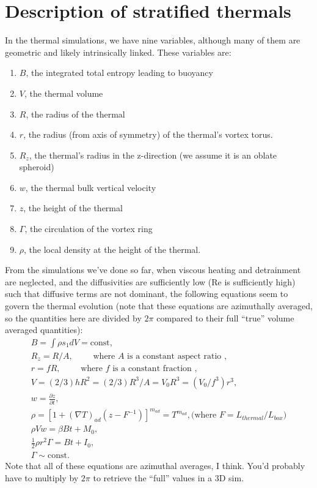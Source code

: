 \documentclass[onecolumn, amsmath, amsfonts, amssymb]{aastex62}
\newcommand{\grad}{\ensuremath{\nabla}}
\begin{document}
\section{Description of stratified thermals}
In the thermal simulations, we have nine variables, although many of them are geometric and
likely intrinsically linked. These variables are:
\begin{enumerate}
\item $B$, the integrated total entropy leading to buoyancy
\item $V$, the thermal volume
\item $R$, the radius of the thermal
\item $r$, the radius (from axis of symmetry) of the thermal's vortex torus.
\item $R_z$, the thermal's radius in the z-direction (we assume it is an oblate spheroid)
\item $w$, the thermal bulk vertical velocity
\item $z$, the height of the thermal
\item $\Gamma$, the circulation of the vortex ring
\item $\rho$, the local density at the height of the thermal.
\end{enumerate}
From the simulations we've done so far, when viscous heating and detrainment are neglected, and the
diffusivities are sufficiently low (Re is sufficiently high) such that diffusive terms are not dominant, the following
equations seem to govern the thermal evolution (note that these equations are azimuthally averaged,
so the quantities here are divided by $2\pi$ compared to their full ``true'' volume averaged
quantities):
\begin{gather}
B = \int \rho s_1 dV = \text{const}, \\
R_z = R/A,\qquad \text{ where $A$ is a constant aspect ratio },\\
r = f R, \qquad \text{ where $f$ is a constant fraction }, \\
V = (2/3) h R^2 = (2/3) R^3/A = V_0 R^3 = (V_0/f^3) r^3, \\
w = \frac{\partial z}{\partial t},\\
\rho = [1 + (\grad T)_{ad}(z - F^{-1})]^{m_{ad}} = T^{m_{ad}}, \text{(where $F = L_{thermal}/L_{box}$)}\\
\rho V w = \beta B t + M_0,  \label{eqn:momentum} \\
\frac{1}{2}\rho r^2 \Gamma = B t + I_0, \label{eqn:impulse} \\
\Gamma \sim \text{const.}
\end{gather}
Note that all of these equations are azimuthal averages, I think. You'd probably have to
multiply by $2\pi$ to retrieve the ``full'' values in a 3D sim.
\end{document}
